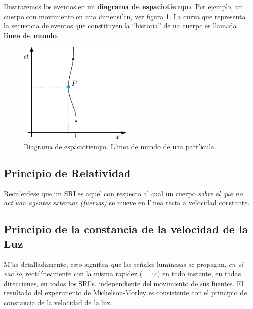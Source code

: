 Ilustraremos los eventos en un \textbf{diagrama de espaciotiempo}. Por ejemplo, un cuerpo con movimiento en una dimensi'on, ver figura \ref{TER1}. La curva que representa la secuencia de eventos que constituyen la ``historia'' de un cuerpo es llamada \textbf{línea de mundo}.

\begin{figure}[!h]
\centerline{\includegraphics[height=5cm]{fig/fig-diagrama-espaciotiempo.pdf}}
\caption{Diagrama de espaciotiempo. L'inea de mundo de una part'icula.}
\label{TER1}
\end{figure}

\subsection{Principio de Relatividad}
\begin{quotation}
\end{quotation}

Recu'erdese que un SRI es aquel con respecto al cual un cuerpo \textit{sobre el que no act'uan agentes externos (fuerzas)} se mueve en l'inea recta a velocidad
constante.


\subsection{Principio de la constancia de la velocidad de la Luz}
 \begin{quotation}
\end{quotation}
M'as detalladamente, esto significa que las se\~nales luminosas se propagan, \textit{en el vac'io}, rectil\'ineamente con la misma rapidez ($=:c$) en todo instante, en todas direcciones, en todos los SRI's, independiente del movimiento de sus fuentes. El resultado del experimento de Michelson-Morley es consistente con el principio de constancia de la velocidad de la luz.

